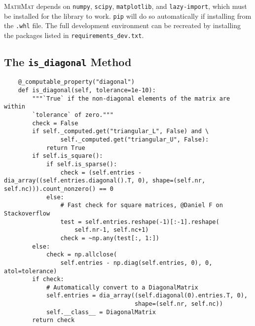 \documentclass[12pt,a4paper]{article}
\newcommand{\mathmat}{\textsc{MathMat} }
\newcommand{\ct}[1]{\texttt{#1}}
\begin{document}
\mathmat depends on \ct{numpy}, \ct{scipy}, \ct{matplotlib}, and \ct{lazy-import}, which must be installed for the library to work. \ct{pip} will do so automatically if installing from the \ct{.whl} file. The full development environment can be recreated by installing the packages listed in \ct{requirements\_dev.txt}.

\subsection{The \ct{is\_diagonal} Method}
\label{code:is_diagonal}
\begin{verbatim}
    @_computable_property("diagonal")
    def is_diagonal(self, tolerance=1e-10):
        """`True` if the non-diagonal elements of the matrix are within
        `tolerance` of zero."""
        check = False
        if self._computed.get("triangular_L", False) and \
                self._computed.get("triangular_U", False):
            return True
        if self.is_square():
            if self.is_sparse():
                check = (self.entries - dia_array((self.entries.diagonal().T, 0), shape=(self.nr, self.nc))).count_nonzero() == 0
            else:
                # Fast check for square matrices, @Daniel F on Stackoverflow
                test = self.entries.reshape(-1)[:-1].reshape(
                    self.nr-1, self.nc+1)
                check = ~np.any(test[:, 1:])
        else:
            check = np.allclose(
                self.entries - np.diag(self.entries, 0), 0, atol=tolerance)
        if check:
            # Automatically convert to a DiagonalMatrix
            self.entries = dia_array((self.diagonal(0).entries.T, 0),
                                     shape=(self.nr, self.nc))
            self.__class__ = DiagonalMatrix
        return check
\end{verbatim}
\end{document}
